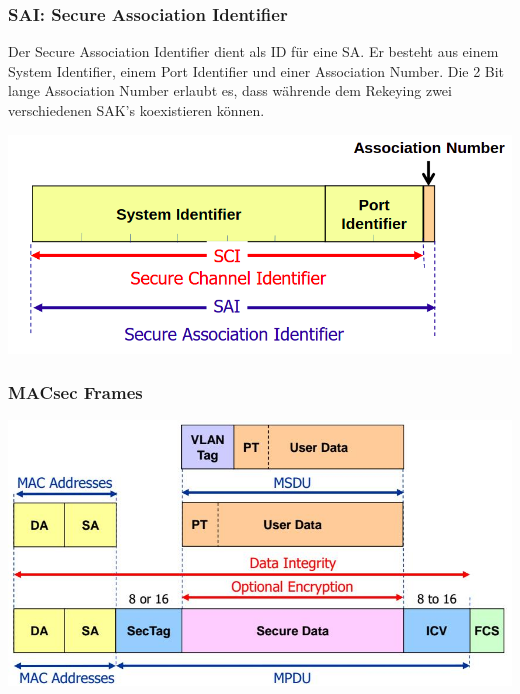 \subsubsection{SAI: Secure Association Identifier}
Der Secure Association Identifier dient als ID für eine SA. Er besteht aus einem System Identifier, einem Port Identifier und einer Association Number. Die 2 Bit lange Association Number erlaubt es, dass währende dem Rekeying zwei verschiedenen SAK's koexistieren können.
\begin{minipage}[t]{1\textwidth}
    \centering
	\includegraphics[width=0.7\linewidth]{images/macsec_sai.png}
\end{minipage}


\subsubsection{MACsec Frames}
\begin{minipage}[t]{1\textwidth}
    \centering
	\includegraphics[width=0.7\linewidth]{images/macsec_frame_format}
\end{minipage}



